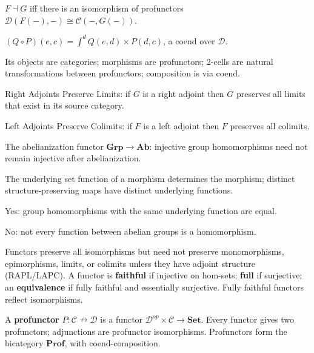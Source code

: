 \begin{exercisesbox}
\begin{qa}
       {$F \dashv G$ iff there is an isomorphism of profunctors
        $\mathcal{D}(F(-), -) \cong \mathcal{C}(-, G(-))$.}

       {$(Q \circ P)(e, c) = \int^d Q(e,d) \times P(d,c)$, a coend over $\mathcal{D}$.}

       {Its objects are categories; morphisms are profunctors; 2-cells are natural
        transformations between profunctors; composition is via coend.}

       {Right Adjoints Preserve Limits: if $G$ is a right adjoint then $G$ preserves
        all limits that exist in its source category.}

       {Left Adjoints Preserve Colimits: if $F$ is a left adjoint then $F$ preserves
        all colimits.}

       {The abelianization functor $\mathbf{Grp} \to \mathbf{Ab}$: injective group
        homomorphisms need not remain injective after abelianization.}

       {The underlying set function of a morphism determines the morphism; distinct
        structure-preserving maps have distinct underlying functions.}

       {Yes: group homomorphisms with the same underlying function are equal.}

       {No: not every function between abelian groups is a homomorphism.}
\end{qa}
\end{exercisesbox}

\begin{summarybox}
Functors preserve all isomorphisms but need not preserve monomorphisms, epimorphisms,
limits, or colimits unless they have adjoint structure (RAPL/LAPC). A functor is
\textbf{faithful} if injective on hom-sets; \textbf{full} if surjective; an
\textbf{equivalence} if fully faithful and essentially surjective. Fully faithful
functors reflect isomorphisms.

A \textbf{profunctor} $P : \mathcal{C} \nrightarrow \mathcal{D}$ is a functor
$\mathcal{D}^{op} \times \mathcal{C} \to \mathbf{Set}$. Every functor gives two
profunctors; adjunctions are profunctor isomorphisms. Profunctors form the
bicategory $\mathbf{Prof}$, with coend-composition.
\end{summarybox}

